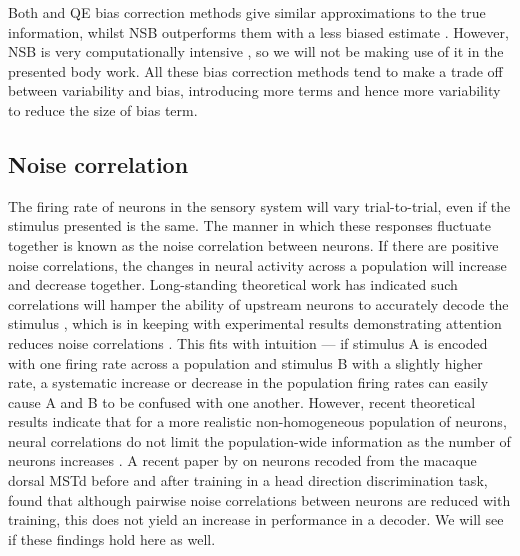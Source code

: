 Both  and \ac{QE} bias correction methods give similar approximations to the true information, whilst \ac{NSB} outperforms them with a less biased estimate \cite{Panzeri2007}.
However, \ac{NSB} is very computationally intensive \cite{Panzeri2007}, so we will not be making use of it in the presented body work.
All these bias correction methods tend to make a trade off between variability and bias, introducing more terms and hence more variability to reduce the size of bias term.



\subsection{Noise correlation}

The firing rate of neurons in the sensory system will vary trial-to-trial, even if the stimulus presented is the same.
The manner in which these responses fluctuate together is known as the noise correlation between neurons.
If there are positive noise correlations, the changes in neural activity across a population will increase and decrease together.
Long-standing theoretical work has indicated such correlations will hamper the ability of upstream neurons to accurately decode the stimulus%
, which is in keeping with experimental results demonstrating attention reduces noise correlations \citep{Cohen2009}.
This fits with intuition --- if stimulus A is encoded with one firing rate across a population and stimulus B with a slightly higher rate, a systematic increase or decrease in the population firing rates can easily cause A and B to be confused with one another.
However, recent theoretical results indicate that for a more realistic non-homogeneous population of neurons, neural correlations do not limit the population-wide information as the number of neurons increases \citep{Oram1998,Averbeck2006,Ecker2011}.
A recent paper by \citet{Gu2011} on neurons recoded from the macaque dorsal \ac{MSTd} before and after training in a head direction discrimination task, found that although pairwise noise correlations between neurons are reduced with training, this does not yield an increase in performance in a decoder.
We will see if these findings hold here as well.




